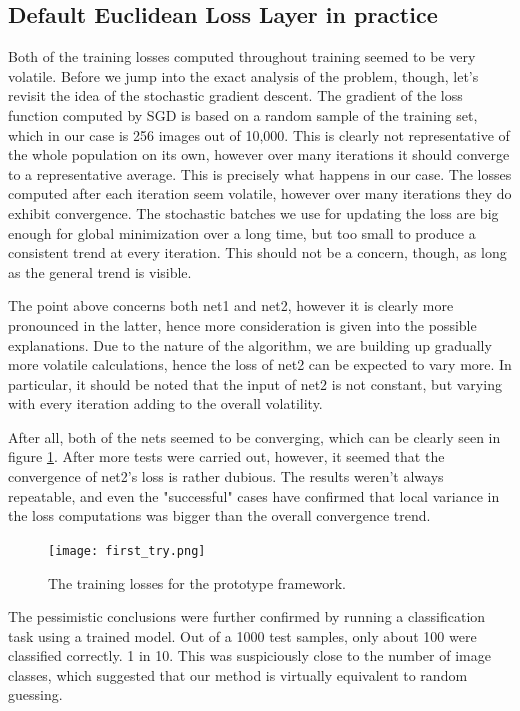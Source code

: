 \documentclass[a4paper, 12pt]{article}
\numberwithin{equation}{section}
\begin{document}
	\subsection{Default Euclidean Loss Layer in practice}
	
	Both of the training losses computed throughout training seemed to be very volatile. Before we jump into the exact analysis of the problem, though, let's revisit the idea of the stochastic gradient descent. The gradient of the loss function computed by SGD is based on a random sample of the training set, which in our case is 256 images out of 10,000. This is clearly not representative of the whole population on its own, however over many iterations it should converge to a representative average. This is precisely what happens in our case. The losses computed after each iteration seem volatile, however over many iterations they do exhibit convergence. The stochastic batches we use for updating the loss are big enough for global minimization over a long time, but too small to produce a consistent trend at every iteration. This should not be a concern, though, as long as the general trend is visible.
	
	The point above concerns both net1 and net2, however it is clearly more pronounced in the latter, hence more consideration is given into the possible explanations. Due to the nature of the algorithm, we are building up gradually more volatile calculations, hence the loss of net2 can be expected to vary more. In particular, it should be noted that the input of net2 is not constant, but varying with every iteration adding to the overall volatility.
	
	After all, both of the nets seemed to be converging, which can be clearly seen in figure \ref{fig:first_try}. After more tests were carried out, however, it seemed that the convergence of net2's loss is rather dubious. The results weren't always repeatable, and even the "successful" cases have confirmed that local variance in the loss computations was bigger than the overall convergence trend.
	
	\begin{figure}[!h]
		\centering
		\texttt{[image: first\_try.png]}
		\caption{\label{fig:first_try}{The training losses for the prototype framework.}}
	\end{figure}
	
	The pessimistic conclusions were further confirmed by running a classification task using a trained model. Out of a 1000 test samples, only about 100 were classified correctly. 1 in 10. This was suspiciously close to the number of image classes, which suggested that our method is virtually equivalent to random guessing.
	
\end{document}
